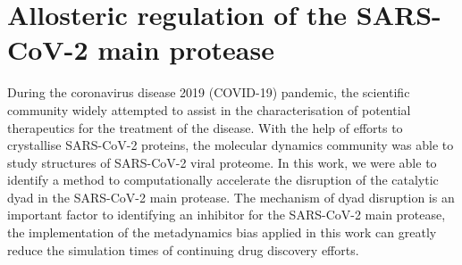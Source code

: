 \chapter{Allosteric regulation of the SARS-CoV-2 main protease}\label{Corona}


During the coronavirus disease 2019 (COVID-19) pandemic, the scientific community widely attempted to assist in the characterisation of potential therapeutics for the treatment of the disease. With the help of efforts to crystallise SARS-CoV-2 proteins, the molecular dynamics community was able to study structures of SARS-CoV-2 viral proteome. In this work, we were able to identify a method to computationally accelerate the disruption of the catalytic dyad in the SARS-CoV-2 main protease. The mechanism of dyad disruption is an important factor to identifying an inhibitor for the SARS-CoV-2 main protease, the implementation of the metadynamics bias applied in this work can greatly reduce the simulation times of continuing drug discovery efforts. 

%
\clearpage

